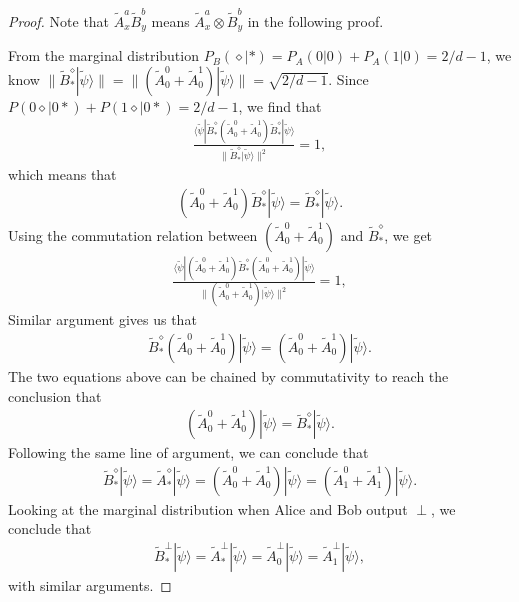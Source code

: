 \documentclass[11pt,letterpaper]{article}
\newcommand{\ket}[1]{|#1\rangle}
\newcommand{\bra}[1]{\langle#1|}
\newcommand{\x}{\otimes}
\newcommand{\1}{\mathbb{1}}
\newcommand{\tA}{\tilde{A}}
\newcommand{\tB}{\tilde{B}}
\newcommand{\tpsi}{\tilde{\psi}}
\newcommand{\pr}[2]{P(#1|#2)}
\newcommand{\pa}[2]{P_A(#1|#2)}
\newcommand{\pb}[2]{P_B(#1|#2)}
\theoremstyle{definition}
\begin{document}
\begin{proof}
Note that $\tA_x^a \tB_y^b$ means $\tA_x^a \x\tB_y^b$ in the following proof.

From the marginal distribution $\pb{\diamond}{\ast} = \pa{0}{0}+\pa{1}{0} = 2/d-1$,
we know $\| \tB_\ast^\diamond \ket{\tpsi} \| = \| (\tA_0^0+\tA_0^1) \ket{\tpsi}\| = \sqrt{2/d-1}$.
Since $\pr{0\diamond}{0\ast} + \pr{1\diamond}{0\ast} = 2/d-1$, we find that 
\begin{align*}
	\frac{\bra{\tpsi}\tB_\ast^\diamond (\tA_0^0+\tA_0^1) \tB_\ast^\diamond\ket{\tpsi}}{ \| \tB_\ast^\diamond \ket{\tpsi} \|^2} = 1,
\end{align*}
which means that 
\begin{align}
	(\tA_0^0+\tA_0^1)\tB_\ast^\diamond \ket{\tpsi} = \tB_\ast^\diamond \ket{\tpsi}.
\end{align}
Using the commutation relation between $(\tA_0^0+\tA_0^1)$ and $\tB_\ast^\diamond$, we get
\begin{align*}
	\frac{\bra{\tpsi} (\tA_0^0+\tA_0^1) \tB_\ast^\diamond(\tA_0^0+\tA_0^1)\ket{\tpsi}}{ \| (\tA_0^0+\tA_0^1) \ket{\tpsi} \|^2} = 1,
\end{align*}
Similar argument gives us that 
\begin{align}
	\tB_\ast^\diamond (\tA_0^0+\tA_0^1) \ket{\tpsi} = (\tA_0^0+\tA_0^1)\ket{\tpsi}.
\end{align}
The two equations above can be chained by commutativity to reach the conclusion that 
\begin{align}
	(\tA_0^0+\tA_0^1)\ket{\tpsi} = \tB_\ast^\diamond \ket{\tpsi}.
\end{align}
Following the same line of argument, we can conclude that
\begin{align}
	\tB_\ast^\diamond \ket{\tpsi} = \tA_\ast^\diamond \ket{\tpsi} = (\tA_0^0+\tA_0^1)\ket{\tpsi} = (\tA_1^0+\tA_1^1)\ket{\tpsi}.
\end{align}
Looking at the marginal distribution when Alice and Bob output $\perp$, we conclude that 
\begin{align}
	\tB_\ast^\perp \ket{\tpsi} = \tA_\ast^\perp \ket{\tpsi} = \tA_0^\perp \ket{\tpsi} = \tA_1^\perp \ket{\tpsi},
\end{align}
with similar arguments.


\end{proof}
\end{document}
